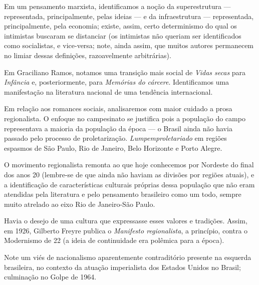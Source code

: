 Em um pensamento marxista, identificamos a noção da superestrutura — representada, principalmente, pelas ideias — e da infraestrutura — representada, principalmente, pela economia; existe, assim, certo determinismo do qual os intimistas buscaram se distanciar (os intimistas não queriam ser identificados como socialistas, e vice-versa; note, ainda assim, que muitos autores permanecem no limiar dessas definições, razoavelmente arbitrárias).

Em Graciliano Ramos, notamos uma transição mais social de \textit{Vidas secas} para \textit{Infância} e, posteriormente, para \textit{Memórias do cárcere}. Identificamos uma manifestação na literatura nacional de uma tendência internacional.

Em relação aos romances sociais, analisaremos com maior cuidado a prosa regionalista. O enfoque no campesinato se justifica pois a população do campo representava a maioria da população da época — o Brasil ainda não havia passado pelo processo de proletarização. \textit{Lumpemproletariado} em regiões espasmos de São Paulo, Rio de Janeiro, Belo Horizonte e Porto Alegre.

O movimento regionalista remonta ao que hoje conhecemos por Nordeste do final dos anos 20 (lembre-se de que ainda não haviam as divisões por regiões atuais), e a identificação de características culturais próprias dessa população que não eram atendidas pela literatura e pelo pensamento brasileiro como um todo, sempre muito atrelado ao eixo Rio de Janeiro-São Paulo.

Havia o desejo de uma cultura que expressasse esses valores e tradições. Assim, em 1926, Gilberto Freyre publica o \textit{Manifesto regionalista}, a princípio, contra o Modernismo de 22 (a ideia de continuidade era polêmica para a época).

Note um viés de nacionalismo aparentemente contraditório presente na esquerda brasileira, no contexto da atuação imperialista dos Estados Unidos no Brasil; culminação no Golpe de 1964.

